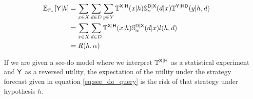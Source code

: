 \begin{align}
    \mathbb{E}_{\mathbb{P}_{\alpha}}[\mathsf{Y}|h] &= \sum_{x\in X} \sum_{d\in D} \sum_{y\in Y} \mathbb{T}^{\mathsf{X}|\mathsf{H}}(x|h) \mathbb{S}_\alpha^{\mathsf{D}|\mathsf{X}}(d|x) \mathbb{T}^{\mathsf{Y}|\mathsf{HD}}(y|h,d)\\
    &= \sum_{x\in X} \sum_{d\in D} \mathbb{T}^{\mathsf{X}|\mathsf{H}}(x|h) \mathbb{S}_\alpha ^{\mathsf{D}|\mathsf{X}}(d|x) l(h,d)\\
    &= R(h,\alpha)
\end{align}

If we are given a see-do model where we interpret $\mathbb{T}^{\mathsf{X}|\mathsf{H}}$ as a statistical experiment and $\mathsf{Y}$ as a reversed utility, the expectation of the utility under the strategy forecast given in equation \ref{eq:see_do_query} is the risk of that strategy under hypothesis $h$.

